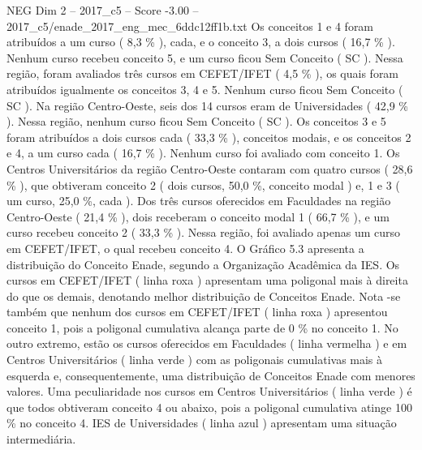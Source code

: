 \begin{textsample}{NEG Dim 2 – 2017\_c5 – Score -3.00 – 2017\_c5/enade\_2017\_eng\_mec\_6ddc12ff1b.txt}
Os conceitos 1 e 4 foram atribuídos a um curso ( 8,3 \% ), cada, e o conceito 3, a dois cursos ( 16,7 \% ).
Nenhum curso recebeu conceito 5, e um curso ficou Sem Conceito ( SC ).
Nessa região, foram avaliados três cursos em CEFET/IFET ( 4,5 \% ), os quais foram atribuídos igualmente os conceitos 3, 4 e 5.
Nenhum curso ficou Sem Conceito ( SC ).
Na região Centro-Oeste, seis dos 14 cursos eram de Universidades ( 42,9 \% ).
Nessa região, nenhum curso ficou Sem Conceito ( SC ).
Os conceitos 3 e 5 foram atribuídos a dois cursos cada ( 33,3 \% ), conceitos modais, e os conceitos 2 e 4, a um curso cada ( 16,7 \% ).
Nenhum curso foi avaliado com conceito 1.
Os Centros Universitários da região Centro-Oeste contaram com quatro cursos ( 28,6 \% ), que obtiveram conceito 2 ( dois cursos, 50,0 \%, conceito modal ) e, 1 e 3 ( um curso, 25,0 \%, cada ).
Dos três cursos oferecidos em Faculdades na região Centro-Oeste ( 21,4 \% ), dois receberam o conceito modal 1 ( 66,7 \% ), e um curso recebeu conceito 2 ( 33,3 \% ).
Nessa região, foi avaliado apenas um curso em CEFET/IFET, o qual recebeu conceito 4.
O Gráfico 5.3 apresenta a distribuição do Conceito Enade, segundo a Organização Acadêmica da IES.
Os cursos em CEFET/IFET ( linha roxa ) apresentam uma poligonal mais à direita do que os demais, denotando melhor distribuição de Conceitos Enade.
Nota -se também que nenhum dos cursos em CEFET/IFET ( linha roxa ) apresentou conceito 1, pois a poligonal cumulativa alcança parte de 0 \% no conceito 1.
No outro extremo, estão os cursos oferecidos em Faculdades ( linha vermelha ) e em Centros Universitários ( linha verde ) com as poligonais cumulativas mais à esquerda e, consequentemente, uma distribuição de Conceitos Enade com menores valores.
Uma peculiaridade nos cursos em Centros Universitários ( linha verde ) é que todos obtiveram conceito 4 ou abaixo, pois a poligonal cumulativa atinge 100 \% no conceito 4.
IES de Universidades ( linha azul ) apresentam uma situação intermediária.

\end{textsample}
